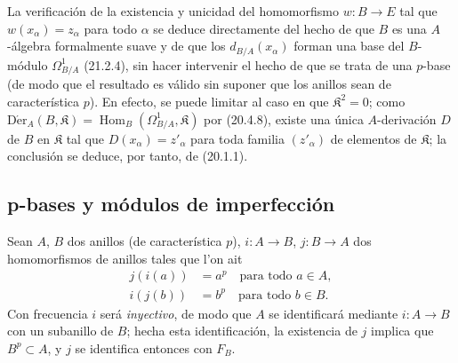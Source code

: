 \begin{remark}[21.2.8]
\label{0.21.2.8-fr}
La verificación de la existencia y unicidad del homomorfismo $w:B\to E$ tal
que $w(x_\alpha)=z_\alpha$ para todo $\alpha$ se deduce directamente del
hecho de que $B$ es una $A$-álgebra formalmente suave y de que los
$d_{B/A}(x_\alpha)$ forman una base del $B$-módulo $\Omega^1_{B/A}$ (21.2.4),
sin hacer intervenir el hecho de que se trata de una $p$-base (de modo que el
resultado es válido sin suponer que los anillos sean de característica $p$).
En efecto, se puede limitar al caso en que $\mathfrak K^2=0$; como
$\operatorname{D\acute{e}r}_A(B,\mathfrak K)=\operatorname{Hom}_B(\Omega^1_{B/A},\mathfrak K)$
por (20.4.8), existe una única $A$-derivación $D$ de $B$ en $\mathfrak K$ tal que
$D(x_\alpha)=z'_\alpha$ para toda familia $(z'_\alpha)$ de elementos de
$\mathfrak K$; la conclusión se deduce, por tanto, de (20.1.1).
\end{remark}

\subsection{p-bases y módulos de imperfección}
\label{0.21.3-fr}

\begin{env}[21.3.1]
\label{0.21.3.1-fr}
Sean $A$, $B$ dos anillos (de característica $p$), $i:A\to B$,
$j:B\to A$ dos homomorfismos de anillos tales que l'on ait
\begin{align}
\tag{21.3.1.1}\label{0.21.3.1.1-fr}
j(i(a))&=a^p\quad\text{para todo }a\in A,\\
\tag{21.3.1.2}\label{0.21.3.1.2-fr}
i(j(b))&=b^p\quad\text{para todo }b\in B.
\end{align}
Con frecuencia $i$ será \emph{inyectivo}, de modo que $A$ se identificará mediante
$i:A\to B$ con un subanillo de $B$; hecha esta identificación, la existencia
de $j$ implica que $B^p\subset A$, y $j$ se identifica entonces con $F_B$.
\end{env}

